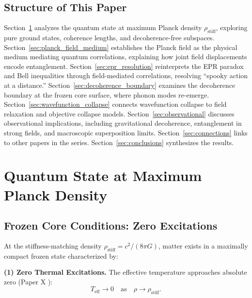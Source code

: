 \documentclass[11pt,a4paper]{article}
\newcommand{\rhostiff}{\ensuremath{\rho_{\mathrm{stiff}}}}
\theoremstyle{definition}
\theoremstyle{remark}
\begin{document}
\subsection{Structure of This Paper}
\label{sec:structure}

Section~\ref{sec:frozen_cores} analyzes the quantum state at maximum Planck density $\rhostiff$, exploring pure ground states, coherence lengths, and decoherence-free subspaces. Section~\ref{sec:planck_field_medium} establishes the Planck field as the physical medium mediating quantum correlations, explaining how joint field displacements encode entanglement. Section~\ref{sec:epr_resolution} reinterprets the EPR paradox and Bell inequalities through field-mediated correlations, resolving ``spooky action at a distance.'' Section~\ref{sec:decoherence_boundary} examines the decoherence boundary at the frozen core surface, where phonon modes re-emerge. Section~\ref{sec:wavefunction_collapse} connects wavefunction collapse to field relaxation and objective collapse models. Section~\ref{sec:observational} discusses observational implications, including gravitational decoherence, entanglement in strong fields, and macroscopic superposition limits. Section~\ref{sec:connections} links to other papers in the series. Section~\ref{sec:conclusions} synthesizes the results.

\section{Quantum State at Maximum Planck Density}
\label{sec:frozen_cores}

\subsection{Frozen Core Conditions: Zero Excitations}
\label{sec:zero_excitations}

At the stiffness-matching density $\rhostiff = c^2/(8\pi G)$, matter exists in a maximally compact frozen state characterized by:

\textbf{(1) Zero Thermal Excitations.} The effective temperature approaches absolute zero (Paper X \cite{SkavbergFrozen2025}):
\begin{equation}
\label{eq:frozen_temp}
T_{\mathrm{eff}} \to 0 \quad \text{as} \quad \rho \to \rhostiff.
\end{equation}
\end{document}
